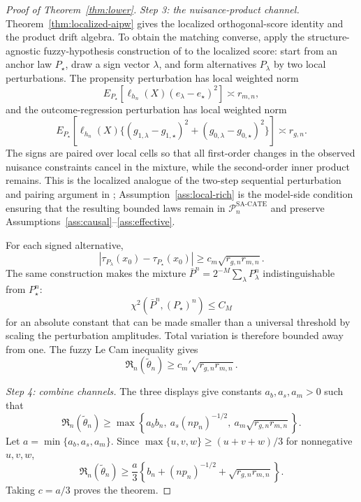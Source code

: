 \begin{proof}[Proof of Theorem~\ref{thm:lower}]
\emph{Step 3: the nuisance-product channel.}
Theorem~\ref{thm:localized-aipw} gives the localized orthogonal-score identity and the product drift algebra.  To obtain the matching converse, apply the structure-agnostic fuzzy-hypothesis construction of \cite{JinSyrgkanis2025GeneralLinearFunctionalLowerBounds} to the localized score: start from an anchor law $P_\star$, draw a sign vector $\lambda$, and form alternatives $P_\lambda$ by two local perturbations.  The propensity perturbation has local weighted norm
\[
  E_{P_\star}[\ell_{h_n}(X)(e_\lambda-e_\star)^2]\asymp r_{m,n},
\]
and the outcome-regression perturbation has local weighted norm
\[
  E_{P_\star}[\ell_{h_n}(X)\{(g_{1,\lambda}-g_{1,\star})^2+(g_{0,\lambda}-g_{0,\star})^2\}]
  \asymp r_{g,n}.
\]
The signs are paired over local cells so that all first-order changes in the observed nuisance constraints cancel in the mixture, while the second-order inner product remains.  This is the localized analogue of the two-step sequential perturbation and pairing argument in \cite{JinSyrgkanis2025GeneralLinearFunctionalLowerBounds}; Assumption~\ref{ass:local-rich} is the model-side condition ensuring that the resulting bounded laws remain in $\mathcal{P}_n^{\mathrm{SA\text{-}CATE}}$ and preserve Assumptions~\ref{ass:causal}--\ref{ass:effective}.

For each signed alternative,
\[
  |\tau_{P_\lambda}(x_0)-\tau_{P_\star}(x_0)|
  \ge c_m\sqrt{r_{g,n}r_{m,n}} .
\]
The same construction makes the mixture $\bar P^n=2^{-M}\sum_\lambda P_\lambda^n$ indistinguishable from $P_\star^n$:
\[
  \chi^2(\bar P^n,(P_\star)^n)\le C_M
\]
for an absolute constant that can be made smaller than a universal threshold by scaling the perturbation amplitudes.  Total variation is therefore bounded away from one.  The fuzzy Le Cam inequality gives
\[
  \mathfrak R_n(\tilde\theta_n)\ge c_m'\sqrt{r_{g,n}r_{m,n}}.
\]

\emph{Step 4: combine channels.}
The three displays give constants $a_b,a_s,a_m>0$ such that
\[
  \mathfrak R_n(\tilde\theta_n)
  \ge
  \max\left\{a_b b_n,\ a_s(n p_n)^{-1/2},\ a_m\sqrt{r_{g,n}r_{m,n}}\right\}.
\]
Let $a=\min\{a_b,a_s,a_m\}$.  Since $\max\{u,v,w\}\ge (u+v+w)/3$ for nonnegative $u,v,w$,
\[
  \mathfrak R_n(\tilde\theta_n)
  \ge
  \frac{a}{3}\left\{b_n+(n p_n)^{-1/2}+\sqrt{r_{g,n}r_{m,n}}\right\}.
\]
Taking $c=a/3$ proves the theorem.
\end{proof}

